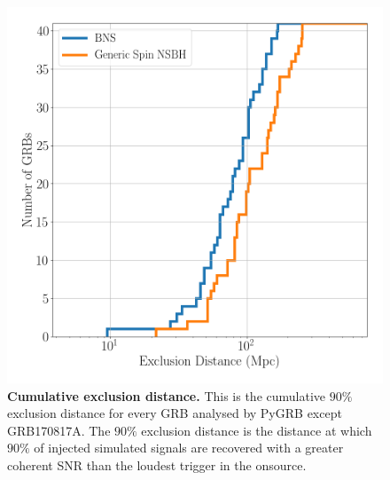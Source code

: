 \documentclass[11pt]{cuthesis}
\begin{document}
\begin{figure}
\begin{center}
\includegraphics[width=0.8\linewidth]{pygrb_exclusion_distance.png}
\end{center}
\caption{\textbf{Cumulative exclusion distance.} This is the cumulative $90\%$ exclusion distance for every GRB analysed by PyGRB except GRB170817A.  The $90\%$ exclusion distance is the distance at which $90\%$ of injected simulated signals are recovered with a greater coherent SNR than the loudest trigger in the onsource. }
\label{fig:ex dist}
\end{figure}
\end{document}
